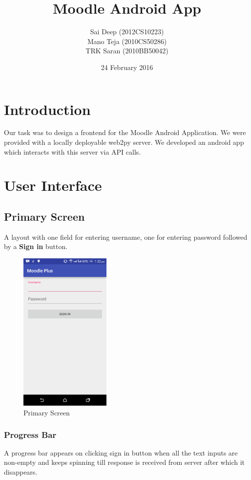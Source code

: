 \documentclass[12pt]{article}
\title{Moodle Android App}
\author{Sai Deep (2012CS10223) \\ Mano Teja (2010CS50286) \\ TRK Saran (2010BB50042) }
\date{24 February 2016}
\begin{document}
\maketitle
\tableofcontents

\section{Introduction}
Our task was to design a frontend for the Moodle Android Application. We were provided with a locally deployable web2py server. We developed an android app which interacts with this server via API calls.
\section{User Interface}
\subsection{Primary Screen}
A layout with one field for entering username, one for entering password followed by a \textbf{Sign in} button. 
\begin{figure}[!ht]
	\centering
	\includegraphics[width=0.4\textwidth]{images/login_screen.png}
	\caption{Primary Screen}
\end{figure}
\FloatBarrier
\subsubsection{Progress Bar}
A progress bar appears on clicking sign in  button when all the text inputs are non-empty and keeps spinning till response is received from server after which it disappears.
\end{document}
